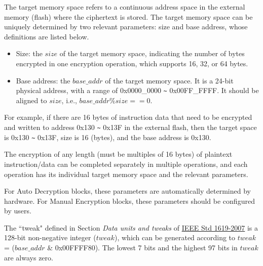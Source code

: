 \documentclass[main\_\_EN.tex]{subfiles}
\begin{document}
The target memory space refers to a continuous address space in the external memory (flash) where the ciphertext is stored. The target memory space can be uniquely determined by two relevant parameters: size and base address, whose definitions are listed below.

\begin{itemize}
    \item Size: the \begin{math} size \end{math} of the target memory space, indicating the number of bytes encrypted in one encryption operation, which supports 16, 32, or 64 bytes.
    \item Base address: the \begin{math} base\_addr\end{math} of the target memory space. It is a 24-bit physical address, with a range of 0x0000\_0000 \verb+~+ 0x00FF\_FFFF. It should be aligned to \begin{math} size \end{math}, i.e., \begin{math} base\_addr \% size == 0 \end{math}.
\end{itemize}

For example, if there are 16 bytes of instruction data that need to be encrypted and written to address 0x130 \verb+~+ 0x13F in the external flash, then the target space is 0x130 \verb+~+ 0x13F, size is 16 (bytes), and the base address is 0x130.

The encryption of any length (must be multiples of 16 bytes) of plaintext instruction/data can be completed separately in multiple operations, and each operation has its individual target memory space and the relevant parameters.

For Auto Decryption blocks, these parameters are automatically determined by hardware. For Manual Encryption blocks, these parameters should be configured by users.

\begin{tiplisting}
\vspace{-2em}
\begin{enumerate}
    The ``tweak" defined in Section \textit{Data units and tweaks} of \href{https://ieeexplore.ieee.org/document/4493450}{IEEE Std 1619-2007} is a 128-bit non-negative integer (\begin{math} tweak \end{math}), which can be generated according to \begin{math} tweak \end{math} = (\begin{math} base\_addr \end{math} \& 0x00FFFF80). The lowest 7 bits and the highest 97 bits in \begin{math} tweak \end{math} are always zero.
\end{enumerate}
\end{tiplisting}
\end{document}
